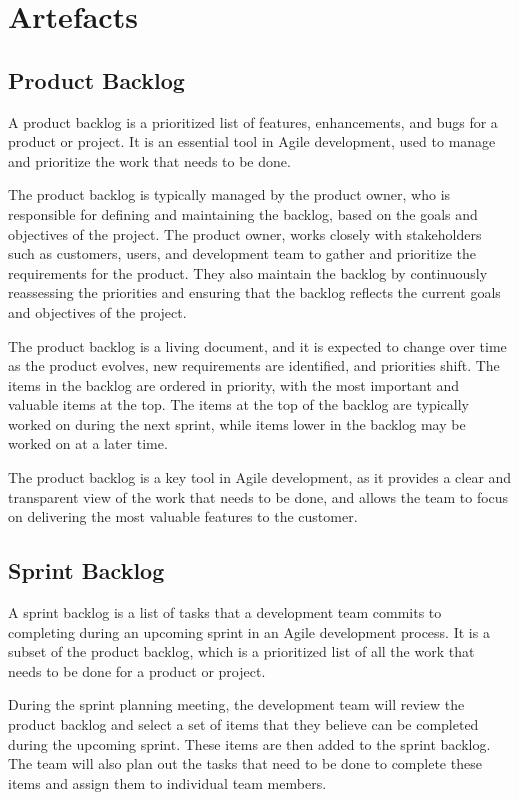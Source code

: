 \documentclass[a4paper,12pt]{article}
\begin{document}
\section{Artefacts}

\subsection{Product Backlog}
A product backlog is a prioritized list of features, enhancements, and bugs for a product or project. It is an essential tool in Agile development, used to manage and prioritize the work that needs to be done.

The product backlog is typically managed by the product owner, who is responsible for defining and maintaining the backlog, based on the goals and objectives of the project.
The product owner, works closely with stakeholders such as customers, users, and development team to gather and prioritize the requirements for the product.
They also maintain the backlog by continuously reassessing the priorities and ensuring that the backlog reflects the current goals and objectives of the project.

The product backlog is a living document, and it is expected to change over time as the product evolves, new requirements are identified, and priorities shift. The items in the backlog are ordered in priority, with the most important and valuable items at the top.
The items at the top of the backlog are typically worked on during the next sprint, while items lower in the backlog may be worked on at a later time.

The product backlog is a key tool in Agile development, as it provides a clear and transparent view of the work that needs to be done, and allows the team to focus on delivering the most valuable features to the customer.


\subsection{Sprint Backlog}
A sprint backlog is a list of tasks that a development team commits to completing during an upcoming sprint in an Agile development process.
It is a subset of the product backlog, which is a prioritized list of all the work that needs to be done for a product or project.

During the sprint planning meeting, the development team will review the product backlog and select a set of items that they believe can be completed during the upcoming sprint.
These items are then added to the sprint backlog.
The team will also plan out the tasks that need to be done to complete these items and assign them to individual team members.
\end{document}
